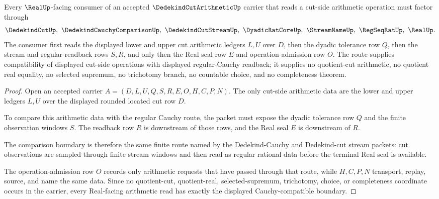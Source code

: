 \begin{theorem}
\label{thm:dedekind-cut-arithmetic-cauchy-compatibility}
Every $\RealUp$-facing consumer of an accepted $\DedekindCutArithmeticUp$ carrier that reads a cut-side arithmetic operation must factor through
$$
\DedekindCutUp,\ \DedekindCauchyComparisonUp,\ \DedekindCutStreamUp,\ \DyadicRatCoreUp,\ \StreamNameUp,\ \RegSeqRatUp,\ \RealUp .
$$
The consumer first reads the displayed lower and upper cut arithmetic ledgers $L,U$ over $D$, then the dyadic tolerance row $Q$, then the stream and regular-readback rows $S,R$, and only then the Real seal row $E$ and operation-admission row $O$. The route supplies compatibility of displayed cut-side operations with displayed regular-Cauchy readback; it supplies no quotient-cut arithmetic, no quotient real equality, no selected supremum, no trichotomy branch, no countable choice, and no completeness theorem.
\end{theorem}
\begin{proof}
Open an accepted carrier $A=(D,L,U,Q,S,R,E,O,H,C,P,N)$. The only cut-side arithmetic data are the lower and upper ledgers $L,U$ over the displayed rounded located cut row $D$.

To compare this arithmetic data with the regular Cauchy route, the packet must expose the dyadic tolerance row $Q$ and the finite observation windows $S$. The readback row $R$ is downstream of those rows, and the Real seal $E$ is downstream of $R$.

The comparison boundary is therefore the same finite route named by the Dedekind-Cauchy and Dedekind-cut stream packets: cut observations are sampled through finite stream windows and then read as regular rational data before the terminal Real seal is available.

The operation-admission row $O$ records only arithmetic requests that have passed through that route, while $H,C,P,N$ transport, replay, source, and name the same data. Since no quotient-cut, quotient-real, selected-supremum, trichotomy, choice, or completeness coordinate occurs in the carrier, every Real-facing arithmetic read has exactly the displayed Cauchy-compatible boundary.
\end{proof}


